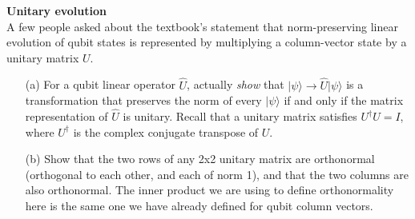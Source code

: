 \documentclass[12pt,letterpaper,boxed,cm]{hmcpset}
\newcommand{\ket}[1]{\big\lvert #1\big\rangle}
\begin{document}

\begin{problem}[1] 
    \textbf{Unitary evolution}\\
    A few people asked about the textbook's statement that norm-preserving linear evolution of qubit states is represented by multiplying a column-vector state by a unitary matrix $U$. 
    \begin{enumerate}
        \item [(a)] For a qubit linear operator $\hat{U}$, actually \textit{show} that $\ket{\psi} \rightarrow \hat{U}\ket{\psi}$ is a transformation that preserves the norm of every $\ket{\psi}$ if and only if the matrix representation of $\hat{U}$ is unitary.  Recall that a unitary matrix satisfies $U^\dagger U = I$, where $U^\dagger$ is the complex conjugate transpose of $U$.
        \item [(b)] Show that the two rows of any 2x2 unitary matrix are orthonormal (orthogonal to each other, and each of norm 1), and that the two columns are also orthonormal.  The inner product we are using to define orthonormality here is the same one we have already defined for qubit column vectors.
    \end{enumerate}
\end{problem}

\begin{solution}
    \vfill
\end{solution}
\newpage
\end{document}
